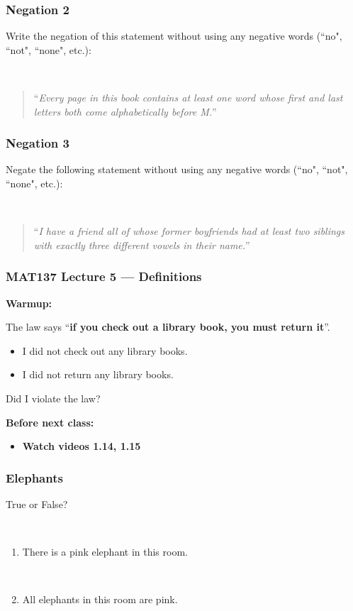 \documentclass[14pt]{beamer}
\begin{document}
\begin{frame}
\frametitle{Negation 2}

Write the negation of this statement without using any negative words (``no", ``not", ``none", etc.): 

\

	\begin{quote}
		``\emph{Every page in this book contains at least one word whose first and last letters both come alphabetically before M.}''
	\end{quote}
\end{frame}


\begin{frame}
\frametitle{Negation 3}

Negate the following statement without using any negative words (``no", ``not", ``none", etc.): 

\

	\begin{quote}
		``\emph{I have a friend all of whose former boyfriends had at least two siblings 
	    with exactly three different vowels in their name.}''
	\end{quote}
\end{frame}



\begin{frame}
\frametitle{MAT137 Lecture 5 --- Definitions}
	{\bf Warmup:}

	The law says ``{\bf if you check out a library book, you must return it}''.
	\begin{itemize}
		\item I did not check out any library books.
		\item I did not return any library books.
	\end{itemize}
	Did I violate the law?

	\vfill
	{\bf Before next class:}
		\begin{itemize} \normalsize
			\item {\bf Watch videos 1.14, 1.15 }
		\end{itemize}
	\vfill

\end{frame}

\begin{frame}
\frametitle{Elephants}

True or False?

\

\begin{enumerate}
	\item  There is a pink elephant in this room.

\

	\item  All elephants in this room are pink.
\end{enumerate}

\end{frame}
\end{document}
